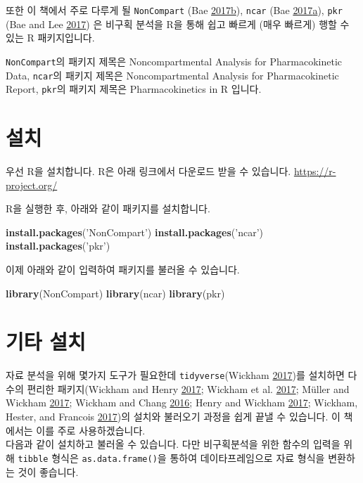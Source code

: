 \documentclass[12pt,]{krantz}
\newenvironment{Shaded}{\begin{snugshade}}{\end{snugshade}}
\newcommand{\KeywordTok}[1]{\textcolor[rgb]{0.13,0.29,0.53}{\textbf{#1}}}
\newcommand{\StringTok}[1]{\textcolor[rgb]{0.31,0.60,0.02}{#1}}
\newcommand{\NormalTok}[1]{#1}
\theoremstyle{definition}
\theoremstyle{definition}
\theoremstyle{definition}
\theoremstyle{remark}
\begin{document}
또한 이 책에서 주로 다루게 될 \texttt{NonCompart} (Bae
\protect\hyperlink{ref-R-NonCompart}{2017}\protect\hyperlink{ref-R-NonCompart}{b}),
\texttt{ncar} (Bae
\protect\hyperlink{ref-R-ncar}{2017}\protect\hyperlink{ref-R-ncar}{a}),
\texttt{pkr} (Bae and Lee \protect\hyperlink{ref-R-pkr}{2017}) 은 비구획
분석을 R을 통해 쉽고 빠르게 (매우 빠르게) 행할 수 있는 R 패키지입니다.

\texttt{NonCompart}의 패키지 제목은 Noncompartmental Analysis for
Pharmacokinetic Data, \texttt{ncar}의 패키지 제목은 Noncompartmental
Analysis for Pharmacokinetic Report, \texttt{pkr}의 패키지 제목은
Pharmacokinetics in R 입니다.

\section{설치}\label{install}

우선 R을 설치합니다. R은 아래 링크에서 다운로드 받을 수 있습니다.
\url{https://r-project.org/}

R을 실행한 후, 아래와 같이 패키지를 설치합니다.

\begin{Shaded}
\begin{Highlighting}[]
\KeywordTok{install.packages}\NormalTok{(}\StringTok{'NonCompart'}\NormalTok{)}
\KeywordTok{install.packages}\NormalTok{(}\StringTok{'ncar'}\NormalTok{)}
\KeywordTok{install.packages}\NormalTok{(}\StringTok{'pkr'}\NormalTok{)}
\end{Highlighting}
\end{Shaded}

이제 아래와 같이 입력하여 패키지를 불러올 수 있습니다.

\begin{Shaded}
\begin{Highlighting}[]
\KeywordTok{library}\NormalTok{(NonCompart)}
\KeywordTok{library}\NormalTok{(ncar)}
\KeywordTok{library}\NormalTok{(pkr)}
\end{Highlighting}
\end{Shaded}

\section{기타 설치}\label{-}

자료 분석을 위해 몇가지 도구가 필요한데 \texttt{tidyverse}(Wickham
\protect\hyperlink{ref-R-tidyverse}{2017})를 설치하면 다수의 편리한
패키지(Wickham and Henry \protect\hyperlink{ref-R-tidyr}{2017}; Wickham
et al. \protect\hyperlink{ref-R-dplyr}{2017}; Müller and Wickham
\protect\hyperlink{ref-R-tibble}{2017}; Wickham and Chang
\protect\hyperlink{ref-R-ggplot2}{2016}; Henry and Wickham
\protect\hyperlink{ref-R-purrr}{2017}; Wickham, Hester, and Francois
\protect\hyperlink{ref-R-readr}{2017})의 설치와 불러오기 과정을 쉽게
끝낼 수 있습니다. 이 책에서는 이를 주로 사용하겠습니다.\\
다음과 같이 설치하고 불러올 수 있습니다. 다만 비구획분석을 위한 함수의
입력을 위해 \texttt{tibble} 형식은 \texttt{as.data.frame()}을 통하여
데이타프레임으로 자료 형식을 변환하는 것이 좋습니다.
\end{document}
